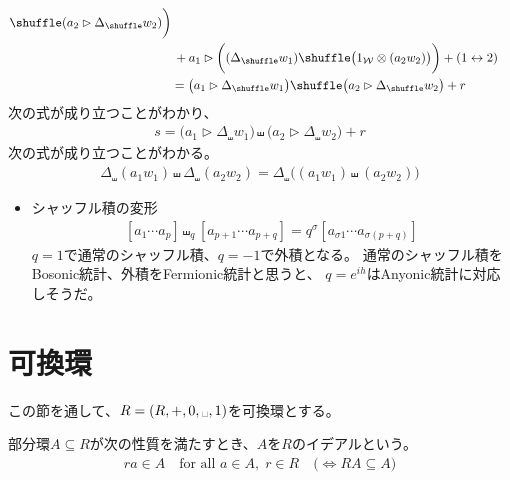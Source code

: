 {\begin{equation*}
\begin{split}
			\shuffle(a_2\rhd\Delta_\shuffle w_2)\biggr) \\
		&\,+ a_1\rhd\biggl((\Delta_\shuffle w_1)
			\shuffle\bigl(1_\W\otimes(a_2w_2)\bigr)\biggr) + (1\swap2) \\
		&= \bigl(a_1\rhd\Delta_\shuffle w_1\bigr)
			\shuffle\bigl(a_2\rhd\Delta_\shuffle w_2\bigr) + r
	\end{split}\end{equation*}
	次の式が成り立つことがわかり、
	\begin{equation*}\begin{split}
		s = \bigl(a_1\rhd\Delta_\shuffle w_1\bigr)
		\shuffle\bigl(a_2\rhd\Delta_\shuffle w_2\bigr) + r
	\end{split}\end{equation*}
	次の式が成り立つことがわかる。
	\begin{equation*}\begin{split}
		\Delta_\shuffle(a_1w_1)\shuffle\Delta_\shuffle(a_2w_2)
		= \Delta_\shuffle\bigl((a_1w_1)\shuffle(a_2w_2)\bigr)
	\end{split}\end{equation*}

	\begin{todo}[知りたいこと]\label{todo:知りたいこと} %
		\begin{itemize}\setlength{\itemsep}{-1mm} %
			\item シャッフル積の変形
			\begin{equation*}\begin{split}
				[a_1\cdots a_p]\shuffle_q[a_{p+1}\cdots a_{p+q}]
				= q^{\sigma} [a_{\sigma1}\cdots a_{\sigma(p+q)}]
			\end{split}\end{equation*}
			$q=1$で通常のシャッフル積、$q=-1$で外積となる。
			通常のシャッフル積をBosonic統計、外積をFermionic統計と思うと、
			$q=e^{ih}$はAnyonic統計に対応しそうだ。
		\end{itemize} %
	\end{todo} %

\section{可換環}\label{s1:可換環} %
	この節を通して、$R=(R,+,0,\myspace,1)$を可換環とする。

	\begin{definition}[可換環のイデアル]\label{def:可換環のイデアル} %
		部分環$A\subseteq R$が次の性質を満たすとき、$A$を$R$のイデアルという。
		\begin{equation*}\begin{split}
			ra\in A \quad\text{for all } a\in A,\; r\in R
			\quad\bigl(\iff RA\subseteq A \bigr)
		\end{split}\end{equation*}
	\end{definition} %

}
